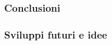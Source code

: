 \begin{frame}
\frametitle{Conclusioni}

\end{frame}

\begin{frame}
\frametitle{Sviluppi futuri e idee}

\end{frame}
